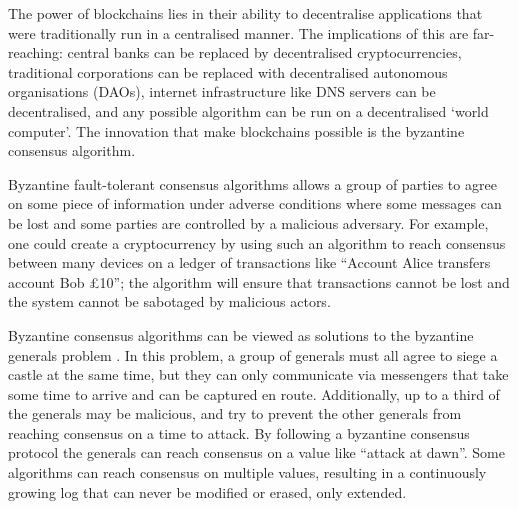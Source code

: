 

The power of blockchains lies in their ability to decentralise applications that were traditionally run in a centralised manner. The implications of this are far-reaching: central banks can be replaced by decentralised cryptocurrencies, traditional corporations can be replaced with decentralised autonomous organisations (DAOs), internet infrastructure like DNS servers can be decentralised, and any possible algorithm can be run on a decentralised `world computer'. The innovation that make blockchains possible is the byzantine consensus algorithm.

Byzantine fault-tolerant consensus algorithms allows a group of parties to agree on some piece of information under adverse conditions where some messages can be lost and some parties are controlled by a malicious adversary. For example, one could create a cryptocurrency by using such an algorithm to reach consensus between many devices on a ledger of transactions like ``Account Alice transfers account Bob £10''; the algorithm will ensure that transactions cannot be lost and the system cannot be sabotaged by malicious actors.

Byzantine consensus algorithms can be viewed as solutions to the byzantine generals problem \cite{lamport_byzantine_nodate}. In this problem, a group of generals must all agree to siege a castle at the same time, but they can only communicate via messengers that take some time to arrive and can be captured en route. Additionally, up to a third of the generals may be malicious, and try to prevent the other generals from reaching consensus on a time to attack. By following a byzantine consensus protocol the generals can reach consensus on a value like ``attack at dawn''. Some algorithms can reach consensus on multiple values, resulting in a continuously growing log that can never be modified or erased, only extended.

